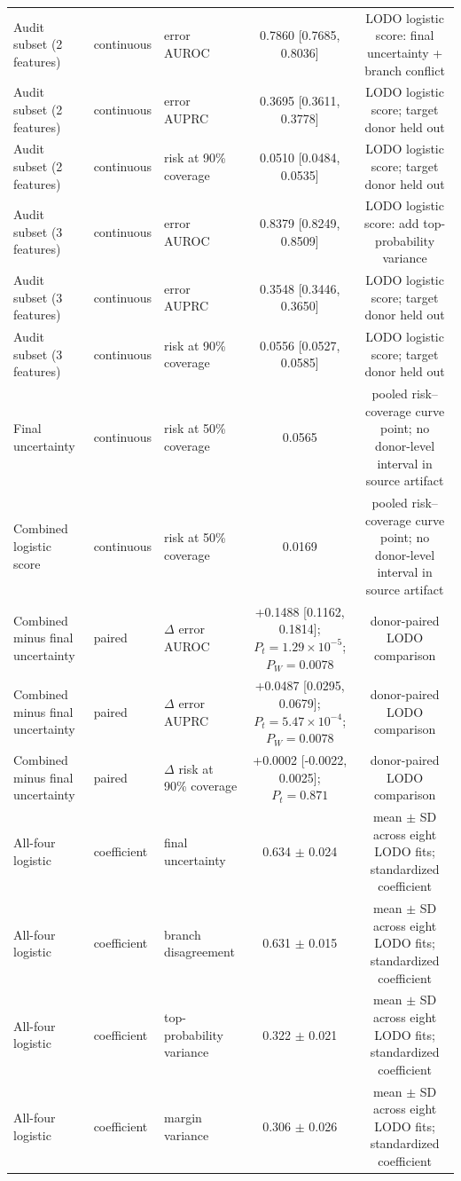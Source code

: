 \begin{tabular}{lllcc}
Audit subset (2 features) & continuous & error AUROC & 0.7860 [0.7685, 0.8036] & LODO logistic score: final uncertainty + branch conflict \\
Audit subset (2 features) & continuous & error AUPRC & 0.3695 [0.3611, 0.3778] & LODO logistic score; target donor held out \\
Audit subset (2 features) & continuous & risk at 90\% coverage & 0.0510 [0.0484, 0.0535] & LODO logistic score; target donor held out \\
Audit subset (3 features) & continuous & error AUROC & 0.8379 [0.8249, 0.8509] & LODO logistic score: add top-probability variance \\
Audit subset (3 features) & continuous & error AUPRC & 0.3548 [0.3446, 0.3650] & LODO logistic score; target donor held out \\
Audit subset (3 features) & continuous & risk at 90\% coverage & 0.0556 [0.0527, 0.0585] & LODO logistic score; target donor held out \\
Final uncertainty & continuous & risk at 50\% coverage & 0.0565 & pooled risk--coverage curve point; no donor-level interval in source artifact \\
Combined logistic score & continuous & risk at 50\% coverage & 0.0169 & pooled risk--coverage curve point; no donor-level interval in source artifact \\
Combined minus final uncertainty & paired & $\Delta$ error AUROC & +0.1488 [0.1162, 0.1814]; $P_t=1.29\times10^{-5}$; $P_W=0.0078$ & donor-paired LODO comparison \\
Combined minus final uncertainty & paired & $\Delta$ error AUPRC & +0.0487 [0.0295, 0.0679]; $P_t=5.47\times10^{-4}$; $P_W=0.0078$ & donor-paired LODO comparison \\
Combined minus final uncertainty & paired & $\Delta$ risk at 90\% coverage & +0.0002 [-0.0022, 0.0025]; $P_t=0.871$ & donor-paired LODO comparison \\
All-four logistic & coefficient & final uncertainty & 0.634 $\pm$ 0.024 & mean $\pm$ SD across eight LODO fits; standardized coefficient \\
All-four logistic & coefficient & branch disagreement & 0.631 $\pm$ 0.015 & mean $\pm$ SD across eight LODO fits; standardized coefficient \\
All-four logistic & coefficient & top-probability variance & 0.322 $\pm$ 0.021 & mean $\pm$ SD across eight LODO fits; standardized coefficient \\
All-four logistic & coefficient & margin variance & 0.306 $\pm$ 0.026 & mean $\pm$ SD across eight LODO fits; standardized coefficient \\
\bottomrule
\end{tabular}
